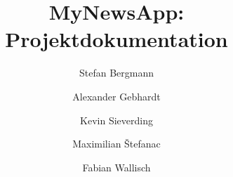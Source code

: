 
\begin{titlepage}
    \pagestyle{empty}

    \title{MyNewsApp: Projektdokumentation}
    \author{Stefan Bergmann \and Alexander Gebhardt \and Kevin Sieverding \and Maximilian Štefanac \and Fabian Wallisch}

    \maketitle
\end{titlepage}
